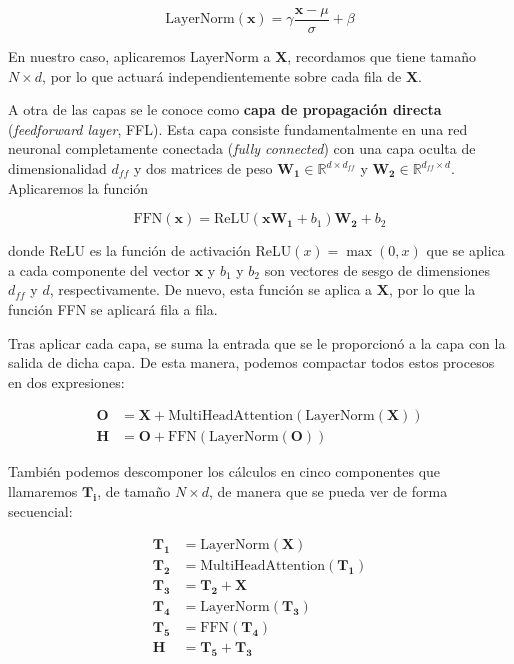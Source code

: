 \documentclass[12pt,twoside]{article}
\begin{document}
\begin{equation}
    \text{LayerNorm}(\mathbf{x})=\gamma\frac{\mathbf{x}-\mu}{\sigma}+\beta
\end{equation}

En nuestro caso, aplicaremos LayerNorm a $\mathbf{X}$, recordamos que tiene tamaño $N\times d$, por lo que actuará independientemente sobre cada fila de $\mathbf{X}$.

A otra de las capas se le conoce como \textbf{capa de propagación directa} (\textit{feedforward layer}, FFL). Esta capa consiste fundamentalmente en una red neuronal completamente conectada (\textit{fully connected}) con una capa oculta de dimensionalidad $d_{ff}$ y dos matrices de peso $\mathbf{W_1}\in\mathbb{R}^{d\times d_{ff}}$ y $\mathbf{W_2}\in\mathbb{R}^{d_{ff}\times d}$. Aplicaremos la función

\begin{equation}
    \text{FFN}(\mathbf{x})=\text{ReLU}(\mathbf{xW_1}+b_1)\mathbf{W_2}+b_2
\end{equation}

donde ReLU es la función de activación ReLU$(x)=\max(0,x)$ que se aplica a cada componente del vector $\mathbf{x}$ y $b_1$ y $b_2$ son vectores de sesgo de dimensiones $d_{ff}$ y $d$, respectivamente. De nuevo, esta función se aplica a $\mathbf{X}$, por lo que la función FFN se aplicará fila a fila.

Tras aplicar cada capa, se suma la entrada que se le proporcionó a la capa con la salida de dicha capa. De esta manera, podemos compactar todos estos procesos en dos expresiones:

\begin{align}
    \mathbf{O} &= \mathbf{X}+\text{MultiHeadAttention}(\text{LayerNorm}(\mathbf{X})) \\
    \mathbf{H} &= \mathbf{O}+\text{FFN}(\text{LayerNorm}(\mathbf{O}))
\end{align}

También podemos descomponer los cálculos en cinco componentes que llamaremos $\mathbf{T_i}$, de tamaño $N\times d$, de manera que se pueda ver de forma secuencial:

\begin{align}
    \mathbf{T_1} &= \text{LayerNorm}(\mathbf{X})\\
    \mathbf{T_2} &= \text{MultiHeadAttention}(\mathbf{T_1})\\
    \mathbf{T_3} &= \mathbf{T_2}+\mathbf{X}\\
    \mathbf{T_4} &= \text{LayerNorm}(\mathbf{T_3})\\
    \mathbf{T_5} &= \text{FFN}(\mathbf{T_4})\\
    \mathbf{H} &= \mathbf{T_5}+\mathbf{T_3}
\end{align}
\end{document}
